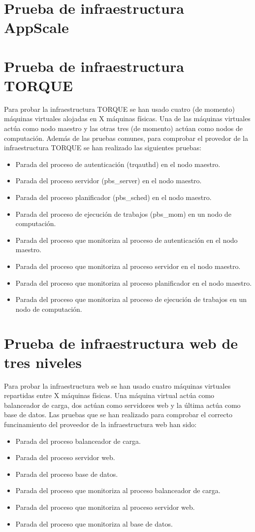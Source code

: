 \section{Prueba de infraestructura AppScale}


\section{Prueba de infraestructura TORQUE}

Para probar la infraestructura TORQUE se han usado cuatro (de momento) máquinas virtuales alojadas en X máquinas físicas. Una de las máquinas virtuales actúa como nodo maestro y las otras tres (de momento) actúan como nodos de computación. Además de las pruebas comunes, para comprobar el provedor de la infraestructura TORQUE se han realizado las siguientes pruebas:

\begin{itemize}
\item Parada del proceso de autenticación (trqauthd) en el nodo maestro.
\item Parada del proceso servidor (pbs\_server) en el nodo maestro.
\item Parada del proceso planificador (pbs\_sched) en el nodo maestro.
\item Parada del proceso de ejecución de trabajos (pbs\_mom) en un nodo de computación.
\item Parada del proceso que monitoriza al proceso de autenticación en el nodo maestro.
\item Parada del proceso que monitoriza al proceso servidor en el nodo maestro.
\item Parada del proceso que monitoriza al proceso planificador en el nodo maestro.
\item Parada del proceso que monitoriza al proceso de ejecución de trabajos en un nodo de computación.
\end{itemize}


\section{Prueba de infraestructura web de tres niveles}

Para probar la infraestructura web se han usado cuatro máquinas virtuales repartidas entre X máquinas físicas. Una máquina virtual actúa como balanceador de carga, dos actúan como servidores web y la última actúa como base de datos. Las pruebas que se han realizado para comprobar el correcto funcinamiento del proveedor de la infraestructura web han sido:

\begin{itemize}
\item Parada del proceso balanceador de carga.
\item Parada del proceso servidor web.
\item Parada del proceso base de datos.
\item Parada del proceso que monitoriza al proceso balanceador de carga.
\item Parada del proceso que monitoriza al proceso servidor web.
\item Parada del proceso que monitoriza al base de datos.
\end{itemize}
